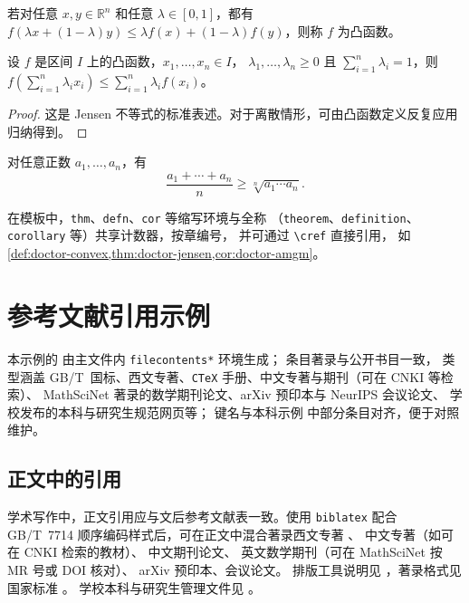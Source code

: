 \begin{defn}\label{def:doctor-convex}
若对任意 $x,y\in \mathbb{R}^n$ 和任意 $\lambda\in[0,1]$，都有
$f(\lambda x+(1-\lambda)y)\le \lambda f(x)+(1-\lambda)f(y)$，则称 $f$ 为凸函数。
\end{defn}

\begin{thm}[Jensen不等式]\label{thm:doctor-jensen}
设 $f$ 是区间 $I$ 上的凸函数，$x_1,\dots,x_n\in I$，
$\lambda_1,\dots,\lambda_n\ge 0$ 且 $\sum_{i=1}^{n}\lambda_i=1$，则
$f\!\left(\sum_{i=1}^{n}\lambda_i x_i\right)\le \sum_{i=1}^{n}\lambda_i f(x_i)$。
\end{thm}

\begin{proof}
这是 Jensen 不等式的标准表述。对于离散情形，可由凸函数定义反复应用归纳得到。
\end{proof}

\begin{cor}\label{cor:doctor-amgm}
对任意正数 $a_1,\dots,a_n$，有
\[
\frac{a_1+\cdots+a_n}{n}\ge \sqrt[n]{a_1\cdots a_n}.
\]
\end{cor}

\begin{rmk}
在模板中，\texttt{thm}、\texttt{defn}、\texttt{cor} 等缩写环境与全称%
（\texttt{theorem}、\texttt{definition}、\texttt{corollary} 等）共享计数器，按章编号，%
并可通过 \texttt{\textbackslash cref} 直接引用，%
如 \cref{def:doctor-convex,thm:doctor-jensen,cor:doctor-amgm}。%
\end{rmk}

\chapter{参考文献引用示例}\label{ch:doctor-bib}

\noindent 本示例的%
%
由主文件内 \texttt{filecontents*} 环境生成；%
条目著录与公开书目一致，%
类型涵盖 GB/T~国标、西文专著、\texttt{CTeX} 手册、中文专著与期刊（可在 CNKI 等检索）、%
MathSciNet 著录的数学期刊论文、arXiv 预印本与 NeurIPS 会议论文、%
学校发布的本科与研究生规范网页等；%
键名与本科示例  中部分条目对齐，便于对照维护。%

\section{正文中的引用}
{\sloppy
学术写作中，正文引用应与文后参考文献表一致。使用 \texttt{biblatex} 配合
GB/T~7714 顺序编码样式后，可在正文中混合著录西文专著%
\cite{knuth1984texbook,lamport1994latex,mittelbach2004companion}、%
中文专著（如可在 CNKI 检索的教材）\cite{zhouzhihua2016ml}、%
中文期刊论文\cite{liguojie2012bigdata}、%
英文数学期刊（可在 MathSciNet 按 MR 号或 DOI 核对）\cite{WalpuskiZhang2021DMJ}、%
arXiv 预印本\cite{taubes2020compactness}、会议论文\cite{vaswani2017attention}。%
排版工具说明见 \cite{ctex2022}，著录格式见国家标准 \cite{gbt7714}。%
学校本科与研究生管理文件见 \cite{swu2021thesisManageNotice,swuUndergradThesisSpecWeb,%
swu2022gradThesisSpecDoc}。%
\par}

